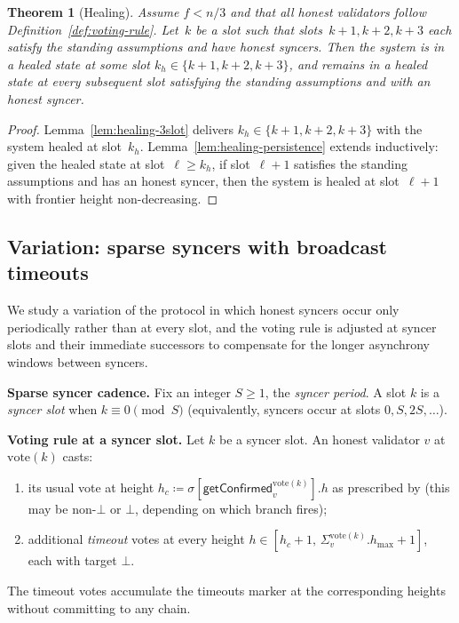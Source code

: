 \documentclass{article}
\newcommand{\hmax}{\ensuremath{h_{\max}}\xspace}
\newcommand{\vote}{\ensuremath{\mathrm{vote}}}
\newcommand{\getConfirmed}{\textsf{getConfirmed}\xspace}
\renewcommand{\paragraph}[1]{\vspace{7pt}\noindent\textbf{#1}}
\theoremstyle{plain}
\newtheorem{theorem}{Theorem}
\theoremstyle{definition}
\theoremstyle{remark}
\begin{document}
\begin{theorem}[Healing]\label{thm:healing}
Assume $f < n/3$ and that all honest validators follow Definition~\ref{def:voting-rule}.
Let~$k$ be a slot such that slots~$k+1, k+2, k+3$ each satisfy the standing assumptions and have honest syncers.
Then the system is in a healed state at some slot $k_h \in \{k+1, k+2, k+3\}$, and remains in a healed state at every subsequent slot satisfying the standing assumptions and with an honest syncer.
\end{theorem}

\begin{proof}
Lemma~\ref{lem:healing-3slot} delivers $k_h \in \{k+1, k+2, k+3\}$ with the system healed at slot~$k_h$.
Lemma~\ref{lem:healing-persistence} extends inductively: given the healed state at slot~$\ell \geq k_h$, if slot~$\ell+1$ satisfies the standing assumptions and has an honest syncer, then the system is healed at slot~$\ell+1$ with frontier height non-decreasing.
\end{proof}

\subsection{Variation: sparse syncers with broadcast timeouts}\label{sec:healing-sparse}

We study a variation of the protocol in which honest syncers occur only periodically rather than at every slot, and the voting rule is adjusted at syncer slots and their immediate successors to compensate for the longer asynchrony windows between syncers.

\paragraph{Sparse syncer cadence.}
Fix an integer $S \geq 1$, the \emph{syncer period}. A slot $k$ is a \emph{syncer slot} when $k \equiv 0 \pmod{S}$ (equivalently, syncers occur at slots $0, S, 2S, \dots$).

\paragraph{Voting rule at a syncer slot.}
Let $k$ be a syncer slot. An honest validator $v$ at $\vote(k)$ casts:
\begin{enumerate}
  \item its usual vote at height $h_c \coloneqq \sigma[\getConfirmed_v^{\vote(k)}].h$ as prescribed by  (this may be non-$\bot$ or $\bot$, depending on which branch fires);
  \item additional \emph{timeout} votes at every height $h \in [h_c+1,\, \Sigma_v^{\vote(k)}.\hmax + 1]$, each with target $\bot$.
\end{enumerate}
The timeout votes accumulate the timeouts marker at the corresponding heights without committing to any chain.
\end{document}
